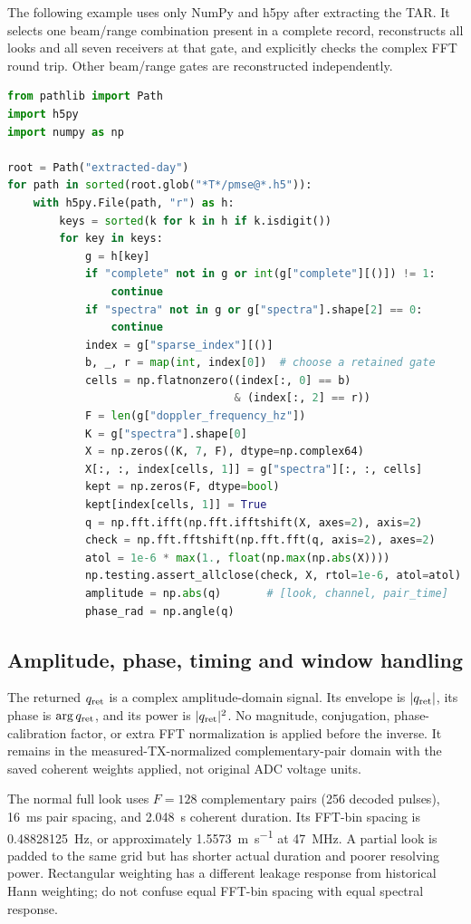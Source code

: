 \documentclass[11pt]{article}
\begin{document}
The following example uses only NumPy and h5py after extracting the TAR. It
selects one beam/range combination present in a complete record, reconstructs
all looks and all seven receivers at that gate, and explicitly checks the
complex FFT round trip. Other beam/range gates are reconstructed independently.
\begin{lstlisting}[language=Python]
from pathlib import Path
import h5py
import numpy as np

root = Path("extracted-day")
for path in sorted(root.glob("*T*/pmse@*.h5")):
    with h5py.File(path, "r") as h:
        keys = sorted(k for k in h if k.isdigit())
        for key in keys:
            g = h[key]
            if "complete" not in g or int(g["complete"][()]) != 1:
                continue
            if "spectra" not in g or g["spectra"].shape[2] == 0:
                continue
            index = g["sparse_index"][()]
            b, _, r = map(int, index[0])  # choose a retained gate
            cells = np.flatnonzero((index[:, 0] == b)
                                   & (index[:, 2] == r))
            F = len(g["doppler_frequency_hz"])
            K = g["spectra"].shape[0]
            X = np.zeros((K, 7, F), dtype=np.complex64)
            X[:, :, index[cells, 1]] = g["spectra"][:, :, cells]
            kept = np.zeros(F, dtype=bool)
            kept[index[cells, 1]] = True
            q = np.fft.ifft(np.fft.ifftshift(X, axes=2), axis=2)
            check = np.fft.fftshift(np.fft.fft(q, axis=2), axes=2)
            atol = 1e-6 * max(1., float(np.max(np.abs(X))))
            np.testing.assert_allclose(check, X, rtol=1e-6, atol=atol)
            amplitude = np.abs(q)       # [look, channel, pair_time]
            phase_rad = np.angle(q)
\end{lstlisting}

\subsection{Amplitude, phase, timing and window handling}
The returned $q_{\rm ret}$ is a complex amplitude-domain signal. Its envelope is
$|q_{\rm ret}|$, its phase is $\arg q_{\rm ret}$, and its power is
$|q_{\rm ret}|^2$. No magnitude, conjugation, phase-calibration factor,
or extra FFT normalization is applied before the inverse. It remains in the
measured-TX-normalized complementary-pair domain with the saved coherent
weights applied, not original ADC voltage units.

The normal full look uses $F=128$ complementary pairs (256 decoded pulses),
\SI{16}{\milli\second} pair spacing, and \SI{2.048}{\second} coherent duration.
Its FFT-bin spacing is \SI{0.48828125}{\hertz}, or approximately
\SI{1.5573}{\metre\per\second} at \SI{47}{\mega\hertz}. A partial look is padded
to the same grid but has shorter actual duration and poorer resolving power.
Rectangular weighting has a different leakage response from historical Hann
weighting; do not confuse equal FFT-bin spacing with equal spectral response.
\end{document}

